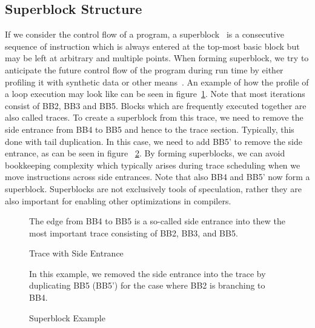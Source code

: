 \subsection{Superblock Structure}
If we consider the control flow of a program, a superblock~\cite{10.1145/161541.159765} is a consecutive sequence of instruction which is always entered at the top-most basic block but may be left at arbitrary and multiple points. When forming superblock, we try to anticipate the future control flow of the program during run time by either profiling it with synthetic data or other means~\cite{639244}. An example of how the profile of a loop execution may look like can be seen in figure~\ref{fig:controlflow_side_enterance}. Note that most iterations consist of BB2, BB3 and BB5. Blocks which are frequently executed together are also called traces. To create a superblock from this trace, we need to remove the side entrance from BB4 to BB5 and hence to the trace section. Typically, this done with tail duplication. In this case, we need to add BB5' to remove the side entrance, as can be seen in figure ~\ref{fig:controlflow_superblock}. By forming superblocks, we can avoid bookkeeping complexity which typically arises during trace scheduling when we move instructions across side entrances.
 Note that also BB4 and BB5' now form a superblock. Superblocks are not exclusively tools of speculation, rather they are also important for enabling other optimizations in compilers. 



\begin{figure}[H]
        \centering
        \caption{Trace with Side Entrance}{The edge from BB4 to BB5 is a so-called side entrance into thew the most important trace consisting of BB2, BB3, and BB5.}
        \label{fig:controlflow_side_enterance}
\end{figure}

\begin{figure}[H]
        \centering
        \caption{Superblock Example}{In this example, we removed the side entrance into the trace by duplicating BB5 (BB5') for the case where BB2 is branching to BB4.}
        \label{fig:controlflow_superblock}
\end{figure}

